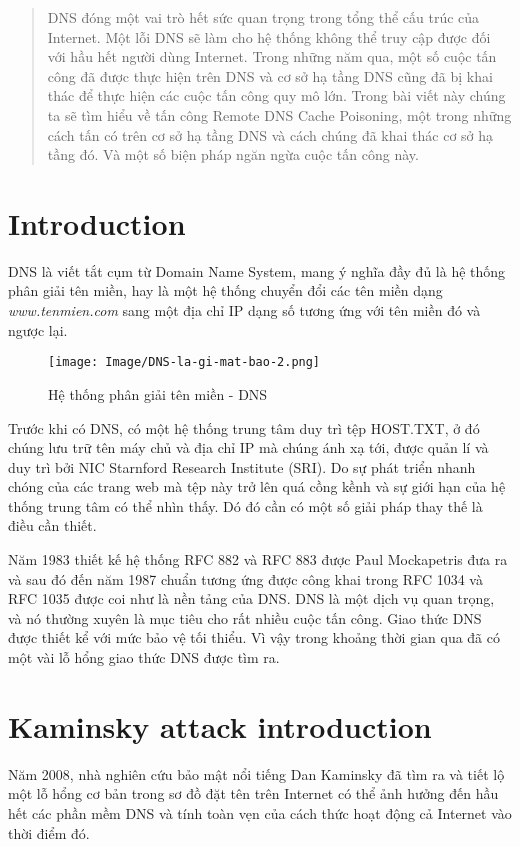 \documentclass{article}
\begin{document}
\begin{abstract}
    DNS đóng một vai trò hết sức quan trọng trong tổng thể cấu trúc của Internet. Một lỗi DNS sẽ làm cho hệ thống không thể truy cập được đối với hầu hết người dùng Internet. Trong những năm qua, một số cuộc tấn công đã được thực hiện trên DNS và cơ sở hạ tầng DNS cũng đã bị khai thác để thực hiện các cuộc tấn công quy mô lớn. Trong bài viết này chúng ta sẽ tìm hiểu về tấn công Remote DNS Cache Poisoning, một trong những cách tấn có trên cơ sở hạ tầng DNS và cách chúng đã khai thác cơ sở hạ tầng đó. Và một số biện pháp ngăn ngừa cuộc tấn công này.
\end{abstract}
\section{Introduction}
DNS là viết tắt cụm từ Domain Name System, mang ý nghĩa đầy đủ là hệ thống phân giải tên miền, hay là một hệ thống chuyển đổi các tên miền dạng \textit{www.tenmien.com} sang một địa chỉ IP dạng số tương ứng với tên miền đó và ngược lại.

\begin{figure} [!htp]
    \centering
    \texttt{[image: Image/DNS-la-gi-mat-bao-2.png]}
    \caption{Hệ thống phân giải tên miền - DNS}
\end{figure}

Trước khi có DNS, có một hệ thống trung tâm duy trì tệp HOST.TXT, ở đó chúng lưu trữ tên máy chủ và địa chỉ IP mà chúng ánh xạ tới, được quản lí và duy trì bởi NIC Starnford Research Institute (SRI). Do sự phát triển nhanh chóng của các trang web mà tệp này trở lên quá cồng kềnh và sự giới hạn của hệ thống trung tâm có thể nhìn thấy. Dó đó cần có một số giải pháp thay thế là điều cần thiết.

Năm 1983 thiết kế hệ thống RFC 882 và RFC 883 được Paul Mockapetris đưa ra và sau đó đến năm 1987 chuẩn tương ứng được công khai trong RFC 1034 và RFC 1035 được coi như là nền tảng của DNS. DNS là một dịch vụ quan trọng, và nó thường xuyên là mục tiêu cho rất nhiều cuộc tấn công. Giao thức DNS được thiết kể với mức bảo vệ tối thiểu. Vì vậy trong khoảng  thời gian qua đã có một vài lỗ hổng giao thức DNS được tìm ra.

\section{Kaminsky attack introduction}
Năm 2008, nhà nghiên cứu bảo mật nổi tiếng Dan Kaminsky đã tìm ra và tiết lộ một lỗ hổng cơ bản trong sơ đồ đặt tên trên Internet có thể ảnh hưởng đến hầu hết các phần mềm DNS và tính toàn vẹn của cách thức hoạt động cả Internet vào thời điểm đó.
\end{document}
